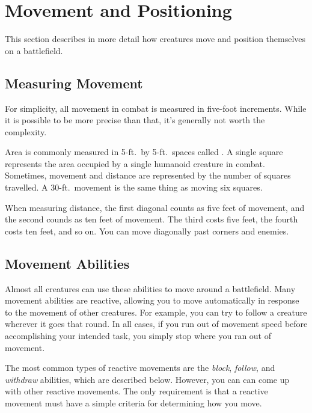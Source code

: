 \section{Movement and Positioning}\label{Movement and Positioning}

    This section describes in more detail how creatures move and position themselves on a battlefield.

    \subsection{Measuring Movement}

        For simplicity, all movement in combat is measured in five-foot increments.
        While it is possible to be more precise than that, it's generally not worth the complexity.

        \label{Squares} Area is commonly measured in 5-ft.\ by 5-ft.\ spaces called .
        A single square represents the area occupied by a single humanoid creature in combat.
        Sometimes, movement and distance are represented by the number of squares travelled.
        A 30-ft.\ movement is the same thing as moving six squares.

        \label{Diagonals} When measuring distance, the first diagonal counts as five feet of movement, and the second counds as ten feet of movement.
        The third costs five feet, the fourth costs ten feet, and so on.
        You can move diagonally past corners and enemies.

    \subsection{Movement Abilities}\label{Movement Abilities}

        Almost all creatures can use these abilities to move around a battlefield.
        Many movement abilities are reactive, allowing you to move automatically in response to the movement of other creatures.
        For example, you can try to follow a creature wherever it goes that round.
        In all cases, if you run out of movement speed before accomplishing your intended task, you simply stop where you ran out of movement.

        The most common types of reactive movements are the \textit{block}, \textit{follow}, and \textit{withdraw} abilities, which are described below.
        However, you can can come up with other reactive movements.
        The only requirement is that a reactive movement must have a simple criteria for determining how you move.


